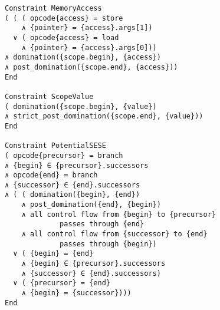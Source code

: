 \begin{figure}[p]
\begin{lstlisting}[language=CAnDL, firstnumber=195]
Constraint MemoryAccess
( ( ( opcode{access} = store
    ∧ {pointer} = {access}.args[1])
  ∨ ( opcode{access} = load
    ∧ {pointer} = {access}.args[0]))
∧ domination({scope.begin}, {access})
∧ post_domination({scope.end}, {access}))
End

Constraint ScopeValue
( domination({scope.begin}, {value})
∧ strict_post_domination({scope.end}, {value}))
End

Constraint PotentialSESE
( opcode{precursor} = branch
∧ {begin} ∈ {precursor}.successors
∧ opcode{end} = branch
∧ {successor} ∈ {end}.successors
∧ ( ( domination({begin}, {end})
    ∧ post_domination({end}, {begin})
    ∧ all control flow from {begin} to {precursor}
             passes through {end}
    ∧ all control flow from {successor} to {end}
             passes through {begin})
  ∨ ( {begin} = {end}
    ∧ {begin} ∈ {precursor}.successors
    ∧ {successor} ∈ {end}.successors)
  ∨ ( {precursor} = {end}
    ∧ {begin} = {successor})))
End
\end{lstlisting}
\vspace{8.18cm}
\end{figure}
